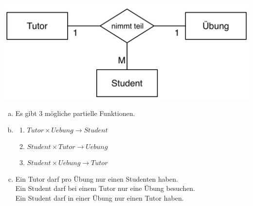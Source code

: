 \begin{frame}
\begin{multicols}{2}
		\begin{center}
			\includegraphics[height=.2\paperheight]{./er.png}
		\end{center}
		\vspace{-1cm}
		\begin{enumerate}[a)]
			\color{TUMBlau}
			\item<2-> Es gibt 3 mögliche partielle Funktionen.
			\item<2-> \begin{enumerate}[1.]
				      \color{TUMBlau}
				      \item \( Tutor \times Uebung \rightarrow Student \)
				      \item \( Student \times Tutor \rightarrow Uebung \)
				      \item \( Student \times Uebung \rightarrow Tutor \)
			      \end{enumerate}
			\item<4->
			      Ein Tutor darf pro Übung nur einen Studenten haben. \\
			      Ein Student darf bei einem Tutor nur eine Übung besuchen. \\
			      Ein Student darf in einer Übung nur einen Tutor haben. \\
		\end{enumerate}
	\end{multicols}
\end{frame}


